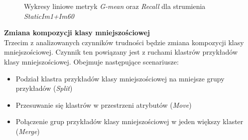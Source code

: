 \begin{figure}[h]
    \centering
    \qquad
    \caption{Wykresy liniowe metryk \textit{G-mean} oraz \textit{Recall} dla strumienia \textit{StaticIm1+Im60}}\label{Figure:StaticIm1_Im60}
\end{figure}

\vspace{0.7cm}

\noindent \textbf{Zmiana kompozycji klasy mniejszościowej}\\

\noindent Trzecim z analizowanych czynników trudności będzie zmiana kompozycji klasy mniejszościowej. Czynnik ten powiązany jest z ruchami klastrów przykładów klasy mniejszościowej. Obejmuje następujące scenariusze:

\begin{itemize}
    \item Podział klastra przykładów klasy mniejszościowej na mniejsze grupy przykładów (\textit{Split})
    \item Przesuwanie się klastrów w przestrzeni atrybutów (\textit{Move})
    \item Połączenie grup przykładów klasy mniejszościowej w jeden większy klaster (\textit{Merge})
\end{itemize}

